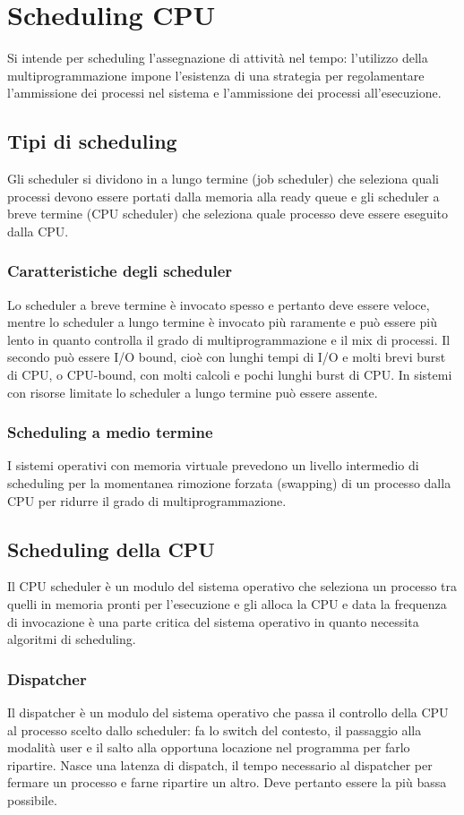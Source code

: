 \chapter{Scheduling CPU}
Si intende per scheduling l'assegnazione di attivit\`a nel tempo: l'utilizzo della multiprogrammazione impone l'esistenza di una strategia per regolamentare l'ammissione dei processi
nel sistema e l'ammissione dei processi all'esecuzione. 
\section{Tipi di scheduling}
Gli scheduler si dividono in a lungo termine (job scheduler) che seleziona quali processi devono essere portati dalla memoria alla ready queue e gli scheduler a breve termine (CPU 
scheduler) che seleziona quale processo deve essere eseguito dalla CPU.
\subsection{Caratteristiche degli scheduler}
Lo scheduler a breve termine \`e invocato spesso e pertanto deve essere veloce, mentre lo scheduler a lungo termine \`e invocato pi\`u raramente e pu\`o essere pi\`u lento in quanto
controlla il grado di multiprogrammazione e il mix di processi. Il secondo pu\`o essere I/O bound, cioè con lunghi tempi di I/O e molti brevi burst di CPU, o CPU-bound, con molti calcoli e pochi lunghi
burst di CPU. In sistemi con risorse limitate lo scheduler a lungo termine pu\`o essere assente. 
\subsection{Scheduling a medio termine}
I sistemi operativi con memoria virtuale prevedono un livello intermedio di scheduling per la momentanea rimozione forzata (swapping) di un processo dalla CPU per ridurre il grado di 
multiprogrammazione.
\section{Scheduling della CPU}
Il CPU scheduler \`e un modulo del sistema operativo che seleziona un processo tra quelli in memoria pronti per l'esecuzione e gli alloca la CPU e data la frequenza di invocazione \`e
una parte critica del sistema operativo in quanto necessita algoritmi di scheduling.
\subsection{Dispatcher}
Il dispatcher \`e un modulo del sistema operativo che passa il controllo della CPU al processo scelto dallo scheduler: fa lo switch del contesto, il passaggio alla modalit\`a user e 
il salto alla opportuna locazione nel programma per farlo ripartire. Nasce una latenza di dispatch, il tempo necessario al dispatcher per fermare un processo e farne ripartire un altro.
Deve pertanto essere la pi\`u bassa possibile. 
